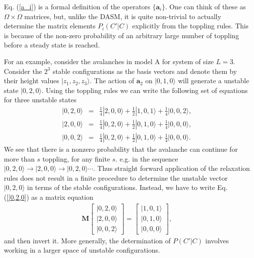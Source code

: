 \documentclass[11pt,a4paper]{book}
\begin{document}
Eq. (\ref{a_i}) is a formal definition of the operators 
$\{\mathbf{a}_i\}$. One can think of these as $\Omega \times \Omega$ 
matrices, but, unlike the DASM, it is quite non-trivial to actually determine
the matrix elements $P_i(C'|C)$ explicitly from the toppling rules. This 
is because of the non-zero probability of an arbitrary large 
number of toppling before a steady state is reached.

For an example, consider the avalanches in model A for system of size $L=3$.
Consider the $2^3$ stable configurations as the basis vectors 
and denote them by their height values $|z_1, z_2, z_3 \rangle$.
The action of $\textbf{a}_2$ on $|0,1,0\rangle$ will
generate a unstable state $|0,2,0\rangle$. Using the toppling rules
we can write the following set of equations for three unstable states
\begin{eqnarray}
  |0, 2, 0\rangle &=& \frac{1}{4}|2, 0, 0\rangle + \frac{1}{2}|1, 0,
1\rangle + \frac{1}{4}|0, 0, 2\rangle, \nonumber \\
  |2, 0, 0\rangle &=& \frac{1}{4}|0, 2, 0\rangle + \frac{1}{2}|0, 1,
0\rangle + \frac{1}{4}|0, 0, 0\rangle, \nonumber \\
  |0, 0, 2\rangle &=& \frac{1}{4}|0, 2, 0\rangle + \frac{1}{2}|0, 1,
0\rangle + \frac{1}{4}|0, 0, 0\rangle.
  \label{|0,2,0}
\end{eqnarray}
We see that there is a nonzero probability that the avalanche
can continue for more than $s$ toppling, for any finite $s$. e.g.  in 
the sequence 
$|0,2,0 \rangle \rightarrow |2,0,0\rangle \rightarrow |0,2,0\rangle \cdots$. 
Thus straight forward application of the relaxation rules does not result 
in a finite procedure to determine the unstable vector $|0,2,0\rangle$
in terms of the stable configurations. Instead, we have to  write Eq. 
(\ref{|0,2,0})
as a matrix equation
\begin{align}
 \textbf{M} 
  \begin{bmatrix}
    |0,2,0\rangle \\
    |2,0,0\rangle \\
    |0,0,2\rangle
 \end{bmatrix}
  =
  \begin{bmatrix}
    |1,0,1\rangle \\
    |0,1,0\rangle \\
    |0,0,0\rangle
 \end{bmatrix},
\end{align}
and then invert it.
More generally, the determination of $P(C'|C)$ involves working in
a larger space of unstable configurations. 
\end{document}
